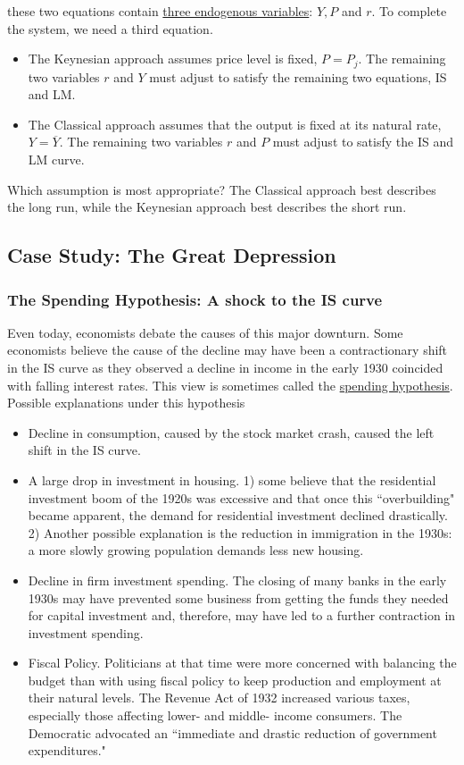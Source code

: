 \documentclass[10pt]{article}
\begin{document}
these two equations contain {\underline {three endogenous variables}}: $ Y, P $ and $ r $.
To complete the system, we need a third equation.
\begin{itemize}
\item The Keynesian approach assumes price level is fixed, $ P = P_{j} $. The remaining two
		variables $ r $ and $ Y $ must adjust to satisfy the remaining two equations, IS and LM.
\item The Classical approach assumes that the output is fixed at its natural rate,
		$ Y =  \overline{Y} $. The remaining two variables $ r $ and $ P $ must adjust to satisfy
		the IS and LM curve.
\end{itemize}


Which assumption is most appropriate? The Classical approach best describes the long run, while
the Keynesian approach best describes the short run.


\subsection{Case Study: The Great Depression}
\subsubsection{The Spending Hypothesis: A shock to the IS curve}
Even today, economists debate the causes of this major downturn. Some economists believe the
cause of the decline may have been a contractionary shift in the IS curve as they observed
a decline in income in the early 1930 coincided with falling interest rates. This view is
sometimes called the {\underline {spending hypothesis}}.
Possible explanations under this hypothesis
\begin{itemize}
\item 
		Decline in consumption, caused by the stock market crash, caused the left shift in the IS curve.
\item 
		A large drop in investment in housing. 1) some believe that the residential investment boom of
		the 1920s was excessive and that once this ``overbuilding" became apparent, the demand for 
		residential investment declined drastically. 2) Another possible explanation is the reduction
		in immigration in the 1930s: a more slowly growing population demands less new housing.
\item 
		Decline in firm investment spending. The closing of many banks in the early 1930s may
		have prevented some business from getting the funds they needed for capital investment and,
		therefore, may have led to a further contraction in investment spending.
\item 
		Fiscal Policy. Politicians at that time were more concerned with balancing the budget than
		with using fiscal policy to keep production and employment at their natural levels.
		The Revenue Act of 1932 increased various taxes, especially those affecting lower- and middle-
		income consumers. The Democratic advocated an ``immediate and drastic reduction of 
		government expenditures."
\end{itemize}
\end{document}
